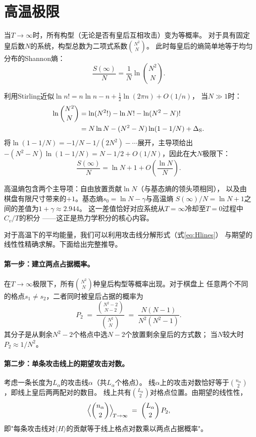 \section{高温极限}

当$T\to\infty$时，所有构型（无论是否有皇后互相攻击）变为等概率。
对于具有固定皇后数$N$的系统，构型总数为二项式系数$\binom{N^{2}}{N}$。
此时每皇后的熵简单地等于均匀分布的Shannon熵：
%
\begin{equation}
  \frac{S(\infty)}{N} = \frac{1}{N}\ln\binom{N^{2}}{N}.
  \label{eq:Sinf_def}
\end{equation}

利用Stirling近似$\ln n!=n\ln n-n+\frac{1}{2}\ln(2\pi n)+O(1/n)$，
当$N\gg1$时：
%
\begin{align}
  \ln\binom{N^{2}}{N}
  &= \ln(N^{2}!) - \ln N! - \ln(N^{2}-N)! \notag\\
  &= N\ln N - (N^{2}-N)\ln(1-1/N)
     + \Delta_{\mathrm{S}}.
  \label{eq:Sinf_stirling}
\end{align}
%
将$\ln(1-1/N)=-1/N-1/(2N^{2})-\cdots$展开，主导项给出
$-(N^{2}-N)\ln(1-1/N)=N-1/2+O(1/N)$，因此在大$N$极限下：
%
\begin{equation}
  \frac{S(\infty)}{N}
  = \ln N + 1 + O\!\left(\frac{\ln N}{N}\right).
  \label{eq:Sinf}
\end{equation}

高温熵包含两个主导项：自由放置贡献$\ln N$（与基态熵的领头项相同），
以及由棋盘有限尺寸带来的$+1$。基态熵$s_{0}=\ln N-\gamma$与高温熵
$S(\infty)/N=\ln N+1$之间的差值为$1+\gamma\approx2.944$。
这一差值恰好对应系统从$T=\infty$冷却至$T=0$过程中$C_{v}/T$的积分
——这正是热力学积分的核心内容。

对于高温下的平均能量，我们可以利用攻击线分解形式（式\ref{eq:Hlines}）
与期望的线性性精确求解。下面给出完整推导。

\paragraph{第一步：建立两点占据概率。}
在$T\to\infty$极限下，所有$\binom{N^{2}}{N}$种皇后构型等概率出现。对于棋盘上
任意两个不同的格点$s_{1}\neq s_{2}$，二者同时被皇后占据的概率为
%
\begin{equation}
  P_{2} \;=\; \frac{\binom{N^{2}-2}{N-2}}{\binom{N^{2}}{N}}
              \;=\; \frac{N(N-1)}{N^{2}(N^{2}-1)}.
  \label{eq:P2}
\end{equation}
%
其分子是从剩余$N^{2}-2$个格点中选$N-2$个放置剩余皇后的方式数；
当$N$较大时$P_{2}\approx1/N^{2}$。

\paragraph{第二步：单条攻击线上的期望攻击对数。}
考虑一条长度为$L_{\alpha}$的攻击线$\alpha$（共$L_{\alpha}$个格点）。
线$\alpha$上的攻击对数恰好等于$\binom{n_{\alpha}}{2}$，即线上皇后两两配对的数目。
线上共有$\binom{L_{\alpha}}{2}$对格点位置。由期望的线性性，
%
\begin{equation}
  \Bigl\langle\binom{n_{\alpha}}{2}\Bigr\rangle_{\!T\to\infty}
  \;=\; \binom{L_{\alpha}}{2}\,P_{2},
  \label{eq:line_expectation}
\end{equation}
%
即"每条攻击线对$\langle H\rangle$的贡献等于线上格点对数乘以两点占据概率"。

